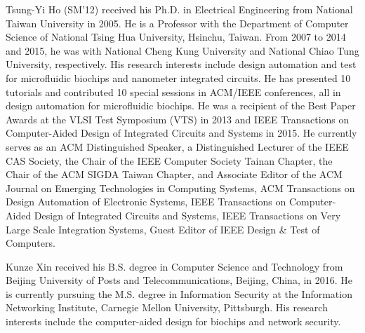 \documentclass[journal]{IEEEtran}
\begin{document}
\vspace{-0.90cm}
\begin{IEEEbiography}{Tsung-Yi Ho (SM'12)} received his Ph.D. in Electrical Engineering from National Taiwan University in 2005. He is a Professor with the Department of Computer Science of National Tsing Hua University, Hsinchu, Taiwan. From 2007 to 2014 and 2015, he was with National Cheng Kung University and National Chiao Tung University, respectively. His research interests include design automation and test for microfluidic biochips and nanometer integrated circuits. He has presented 10 tutorials and contributed 10 special sessions in ACM/IEEE conferences, all in design automation for microfluidic biochips. He was a recipient of the Best Paper Awards at the VLSI Test Symposium (VTS) in 2013 and IEEE Transactions on Computer-Aided Design of Integrated Circuits and Systems in 2015. He currently serves as an ACM Distinguished Speaker, a Distinguished Lecturer of the IEEE CAS Society, the Chair of the IEEE Computer Society Tainan Chapter, the Chair of the ACM SIGDA Taiwan Chapter, and Associate Editor of the ACM Journal on Emerging Technologies in Computing Systems, ACM Transactions on Design Automation of Electronic Systems, IEEE Transactions on Computer-Aided Design of Integrated Circuits and Systems, IEEE Transactions on Very Large Scale Integration Systems, Guest Editor of IEEE Design \& Test of Computers.
\end{IEEEbiography}

\vspace{-0.90cm}
\begin{IEEEbiography}{Kunze Xin} received his B.S. degree in Computer Science and Technology from Beijing University of Posts and Telecommunications, Beijing, China, in 2016. 
	He is currently pursuing the M.S. degree in Information Security at the Information Networking Institute, Carnegie Mellon University, Pittsburgh.
	His research interests include the computer-aided design for biochips and network security.
\end{IEEEbiography}
\end{document}
